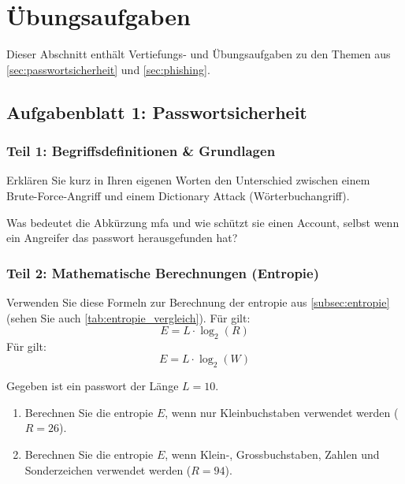 \documentclass[12pt,a4paper]{article}
\begin{document}
\newpage
\section{Übungsaufgaben}
\label{sec:aufgaben}

Dieser Abschnitt enthält Vertiefungs- und Übungsaufgaben zu den Themen aus \mbox{\cref{sec:passwortsicherheit}} und \mbox{\cref{sec:phishing}}.

\subsection{Aufgabenblatt 1: Passwortsicherheit}
\label{subsec:aufgaben_passwort}

\subsubsection{Teil 1: Begriffsdefinitionen \& Grundlagen}

\begin{taskbox}
Erklären Sie kurz in Ihren eigenen Worten den Unterschied zwischen einem \newline Brute-Force-Angriff und einem Dictionary Attack (Wörterbuchangriff).
\end{taskbox}

\begin{taskbox}
Was bedeutet die Abkürzung \gls{mfa} und wie schützt sie einen Account, selbst wenn ein Angreifer das \gls{passwort} herausgefunden hat?
\end{taskbox}

\subsubsection{Teil 2: Mathematische Berechnungen (Entropie)}

Verwenden Sie diese Formeln zur Berechnung der \gls{entropie} aus \cref{subsec:entropie} \newline(sehen Sie auch \cref{tab:entropie_vergleich}).
Für  gilt:
\[
E = L \cdot \log_2(R)
\]
Für  gilt:
\[
E = L \cdot \log_2(W)
\]

\begin{taskbox}
Gegeben ist ein \gls{passwort} der Länge $L = 10$.
\begin{enumerate}[label=\alph*)]
    \item Berechnen Sie die \gls{entropie} $E$, wenn nur Kleinbuchstaben verwendet werden \newline($R = 26$).
    \item Berechnen Sie die \gls{entropie} $E$, wenn Klein-, Grossbuchstaben, Zahlen und Sonderzeichen verwendet werden ($R = 94$).
\end{enumerate}
\end{taskbox}
\end{document}
